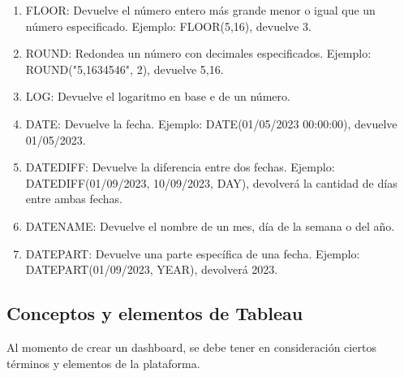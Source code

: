 \documentclass[a4paper, 12pt]{book}
\begin{document}
\begin{enumerate}
	\item FLOOR: Devuelve el número entero más grande menor o igual que un número especificado. Ejemplo: FLOOR(5,16), devuelve 3.
	\item ROUND: Redondea un número con decimales especificados. Ejemplo: ROUND("5,1634546", 2), devuelve 5,16.
	\item LOG: Devuelve el logaritmo en base e de un número.
	\item DATE: Devuelve la fecha. Ejemplo: DATE(01/05/2023 00:00:00), devuelve 01/05/2023.
	\item DATEDIFF: Devuelve la diferencia entre dos fechas. Ejemplo: DATEDIFF(01/09/2023, 10/09/2023, DAY), devolverá la cantidad de días entre ambas fechas.
	\item DATENAME: Devuelve el nombre de un mes, día de la semana o del año.
	\item DATEPART: Devuelve una parte específica de una fecha. Ejemplo: DATEPART(01/09/2023, YEAR), devolverá 2023.
\end{enumerate}

\subsection{Conceptos y elementos de Tableau}
Al momento de crear un dashboard, se debe tener en consideración ciertos términos y elementos de la plataforma.
\end{document}
